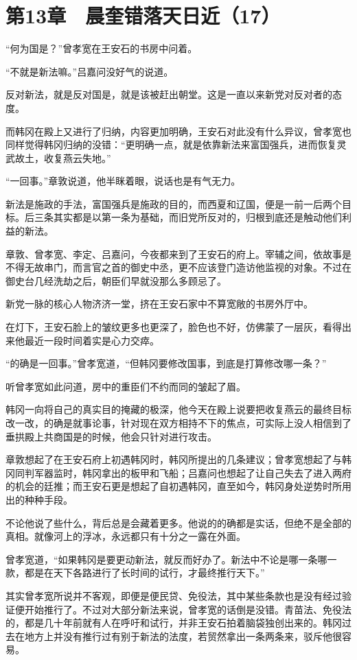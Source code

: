 \section{第13章　晨奎错落天日近（17）}

“何为国是？”曾孝宽在王安石的书房中问着。

“不就是新法嘛。”吕嘉问没好气的说道。

反对新法，就是反对国是，就是该被赶出朝堂。这是一直以来新党对反对者的态度。

而韩冈在殿上又进行了归纳，内容更加明确，王安石对此没有什么异议，曾孝宽也同样觉得韩冈归纳的没错：“更明确一点，就是依靠新法来富国强兵，进而恢复灵武故土，收复燕云失地。”

“一回事。”章敦说道，他半眯着眼，说话也是有气无力。

新法是施政的手法，富国强兵是施政的目的，而西夏和辽国，便是一前一后两个目标。后三条其实都是以第一条为基础，而旧党所反对的，归根到底还是触动他们利益的新法。

章敦、曾孝宽、李定、吕嘉问，今夜都来到了王安石的府上。宰辅之间，依故事是不得无故串门，而言官之首的御史中丞，更不应该登门造访他监视的对象。不过在御史台几经洗劫之后，朝臣们早就没那么多顾忌了。

新党一脉的核心人物济济一堂，挤在王安石家中不算宽敞的书房外厅中。

在灯下，王安石脸上的皱纹更多也更深了，脸色也不好，仿佛蒙了一层灰，看得出来他最近一段时间着实是心力交瘁。

“的确是一回事。”曾孝宽道，“但韩冈要修改国事，到底是打算修改哪一条？”

听曾孝宽如此问道，房中的重臣们不约而同的皱起了眉。

韩冈一向将自己的真实目的掩藏的极深，他今天在殿上说要把收复燕云的最终目标改一改，的确是就事论事，针对现在双方相持不下的焦点，可实际上没人相信到了垂拱殿上共商国是的时候，他会只针对进行攻击。

章敦想起了在王安石府上初遇韩冈时，韩冈所提出的几条建议；曾孝宽想起了与韩冈同判军器监时，韩冈拿出的板甲和飞船；吕嘉问也想起了让自己失去了进入两府的机会的廷推；而王安石更是想起了自初遇韩冈，直至如今，韩冈身处逆势时所用出的种种手段。

不论他说了些什么，背后总是会藏着更多。他说的的确都是实话，但绝不是全部的真相。就像河上的浮冰，永远都只有十分之一露在外面。

曾孝宽道，“如果韩冈是要更动新法，就反而好办了。新法中不论是哪一条哪一款，都是在天下各路进行了长时间的试行，才最终推行天下。”

其实曾孝宽所说并不客观，即便是便民贷、免役法，其中某些条款也是没有经过验证便开始推行了。不过对大部分新法来说，曾孝宽的话倒是没错。青苗法、免役法的，都是几十年前就有人在呼吁和试行，并非王安石拍着脑袋独创出来的。韩冈过去在地方上并没有推行过有别于新法的法度，若贸然拿出一条两条来，驳斥他很容易。


